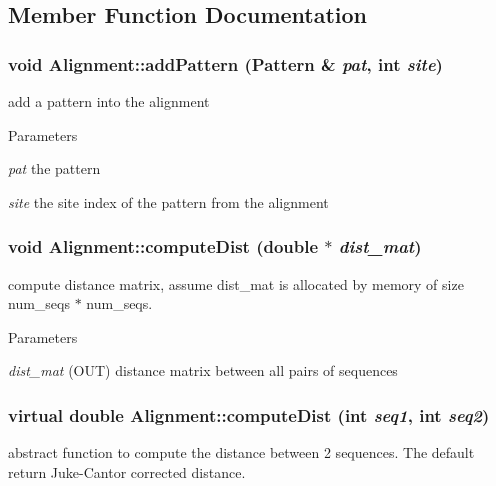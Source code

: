 \subsection{Member Function Documentation}
\hypertarget{classAlignment_a06ccd149a79b56d183752c560a9d8e1d}{
\subsubsection[{addPattern}]{\setlength{\rightskip}{0pt plus 5cm}void Alignment::addPattern ({\bf Pattern} \& {\em pat}, \/  int {\em site})}}
\label{classAlignment_a06ccd149a79b56d183752c560a9d8e1d}
add a pattern into the alignment 
\begin{DoxyParams}{Parameters}
\item[{\em pat}]the pattern \item[{\em site}]the site index of the pattern from the alignment \end{DoxyParams}
\hypertarget{classAlignment_ab6042ffe567a6b036b1715621bbe60d0}{
\subsubsection[{computeDist}]{\setlength{\rightskip}{0pt plus 5cm}void Alignment::computeDist (double $\ast$ {\em dist\_\-mat})}}
\label{classAlignment_ab6042ffe567a6b036b1715621bbe60d0}
compute distance matrix, assume dist\_\-mat is allocated by memory of size num\_\-seqs $\ast$ num\_\-seqs. 
\begin{DoxyParams}{Parameters}
\item[{\em dist\_\-mat}](OUT) distance matrix between all pairs of sequences \end{DoxyParams}
\hypertarget{classAlignment_a88a4b45ead6d8f22c0416cfa01037049}{
\subsubsection[{computeDist}]{\setlength{\rightskip}{0pt plus 5cm}virtual double Alignment::computeDist (int {\em seq1}, \/  int {\em seq2})}}
\label{classAlignment_a88a4b45ead6d8f22c0416cfa01037049}
abstract function to compute the distance between 2 sequences. The default return Juke-\/Cantor corrected distance. 
